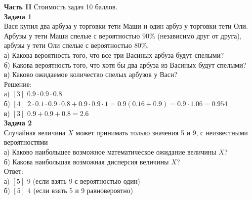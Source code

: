 \documentclass[pdftex,12pt,a4paper]{article}
\begin{document}
\textbf{Часть II} Стоимость задач 10 баллов. \\





\textbf{Задача 1} \\ %
Вася купил два арбуза у торговки тети Маши и один арбуз у торговки тети Оли. Арбузы у тети Маши спелые с вероятностью 90\% (независимо друг от друга), арбузы у тети Оли спелые с вероятностью 80\%. \\
а) Какова вероятность того, что все три Васиных арбуза будут спелыми? \\
б) Какова вероятность того, что хотя бы два арбуза из Васиных будут спелыми? \\
в) Каково ожидаемое количество спелых арбузов у Васи? \\
Решение: \\
а) $[3]$ $0.9\cdot 0.9\cdot 0.8$ \\
б) $[4]$ $2\cdot 0.1\cdot 0.9\cdot 0.8+0.9\cdot 0.9\cdot 1=0.9(0.16+0.9)=0.9\cdot 1.06=0.954$ \\
в) $[3]$ $0.9+0.9+0.8=2.6$ \\

\textbf{Задача 2} \\ %
Случайная величина $X$ может принимать только значения 5 и 9, с неизвестными вероятностями \\
а) Каково наибольшее возможное математическое ожидание величины $X$? \\
б) Какова наибольшая возможная дисперсия величины $X$? \\
Ответ: \\
а) $[5]$ 9 (если взять 9 с вероятностью один) \\
б) $[5]$ 4 (если взять 5 и 9 равновероятно) \\


\end{document}
